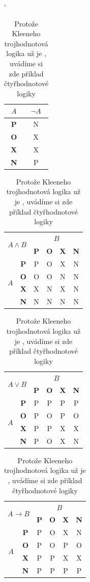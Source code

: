 \documentclass[a4paper,11pt]{article}
\begin{document}
\begin{table}[h] 
\centering 
\catcode`

\begin{tabular}{|>{\bfseries}c|c|}
    \hline
        $A$ & $\neg A$\\
    \hline
         P & N\\
         O & X\\
         X & X\\
         N & P\\
    \hline
\end{tabular}
\begin{tabular}{|c|c|c|c|c|c|}
\hline 
    \multicolumn{2}{|c|}{\multirow{2}{*}{$A \land B$}}&\multicolumn{4}{|c|}{$B$}\\\cline{3-6}
    \multicolumn{2}{|c|}{} & \textbf{P} & \textbf{O} & \textbf{X} & \textbf{N} \\ 
\hline 
\multirow{4}{*}{$A$}
    & \textbf{P}  &  P & O & X & N  \\\cline{2-6} 
    & \textbf{O}  &  O & O & N & N  \\\cline{2-6}
    & \textbf{X}  &  X & N & X & N  \\\cline{2-6}
    & \textbf{N}  &  N & N & N & N  \\\cline{2-6}
  \hline 
\end{tabular}
\begin{tabular}{|c|c|c|c|c|c|}
\hline 
    \multicolumn{2}{|c|}{\multirow{2}{*}{$A \lor B$}}&\multicolumn{4}{|c|}{$B$}\\\cline{3-6}
    \multicolumn{2}{|c|}{} & \textbf{P} & \textbf{O} & \textbf{X} & \textbf{N} \\ 
\hline 
\multirow{4}{*}{$A$}
    & \textbf{P}  &  P & P & P & P  \\\cline{2-6} 
    & \textbf{O}  &  P & O & P & O  \\\cline{2-6}
    & \textbf{X}  &  P & P & X & X  \\\cline{2-6}
    & \textbf{N}  &  P & O & X & N  \\\cline{2-6}
  \hline 
\end{tabular}
\begin{tabular}{|c|c|c|c|c|c|}
\hline 
    \multicolumn{2}{|c|}{\multirow{2}{*}{$A \to B$}}&\multicolumn{4}{|c|}{$B$}\\\cline{3-6}
    \multicolumn{2}{|c|}{} & \textbf{P} & \textbf{O} & \textbf{X} & \textbf{N} \\ 
\hline 
\multirow{4}{*}{$A$}
    & \textbf{P}  &  P & O & X & N  \\\cline{2-6} 
    & \textbf{O}  &  P & O & P & O  \\\cline{2-6}
    & \textbf{X}  &  P & P & X & X  \\\cline{2-6}
    & \textbf{N}  &  P & P & P & P  \\\cline{2-6}
  \hline 
\end{tabular}
\caption{\label{tab:tab2} Protože Kleeneho trojhodnotová logika už je , uvádíme si zde příklad čtyřhodnotové logiky}
\label{logic table}
\end{table}
\pagebreak
\end{document}
